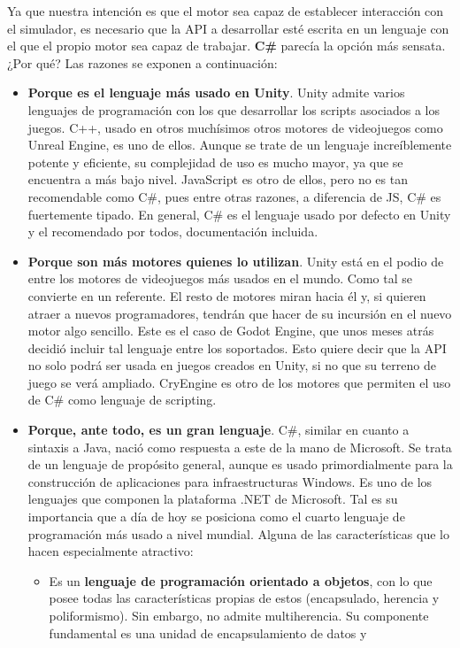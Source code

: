 Ya que nuestra intención es que el motor sea capaz de establecer interacción con el simulador, es necesario que la API a desarrollar esté escrita en un lenguaje con el que el propio motor sea capaz de trabajar. \textbf{C\#} parecía la opción más sensata. ¿Por qué? Las razones se exponen a continuación:

\begin{itemize}
\item\textbf{Porque es el lenguaje más usado en Unity}. Unity admite varios lenguajes de programación con los que desarrollar los scripts asociados a los juegos. C++, usado en otros muchísimos otros motores de videojuegos como Unreal Engine, es uno de ellos. Aunque se trate de un lenguaje increíblemente potente y eficiente, su complejidad de uso es mucho mayor, ya que se encuentra a más bajo nivel. JavaScript es otro de ellos, pero no es tan recomendable como C\#, pues entre otras razones, a diferencia de JS, C\# es fuertemente tipado\cite{unityinaction}. En general, C\# es el lenguaje usado por defecto en Unity y el recomendado por todos, documentación incluida.
\item\textbf{Porque son más motores quienes lo utilizan}. Unity está en el podio de entre los motores de videojuegos más usados en el mundo. Como tal se convierte en un referente. El resto de motores miran hacia él y, si quieren atraer a nuevos programadores, tendrán que hacer de su incursión en el nuevo motor algo sencillo. Este es el caso de Godot Engine, que unos meses atrás decidió incluir tal lenguaje entre los soportados\cite{godotcs}. Esto quiere decir que la API no solo podrá ser usada en juegos creados en Unity, si no que su terreno de juego se verá ampliado. CryEngine es otro de los motores que permiten el uso de C\# como lenguaje de scripting.
\item\textbf{Porque, ante todo, es un gran lenguaje}. C\#, similar en cuanto a sintaxis a Java, nació como respuesta a este de la mano de Microsoft. Se trata de un lenguaje de propósito general, aunque es usado primordialmente para la construcción de aplicaciones para infraestructuras Windows. Es uno de los lenguajes que componen la plataforma .NET de Microsoft. Tal es su importancia que a día de hoy se posiciona como el cuarto lenguaje de programación más usado a nivel mundial\cite{csisfamous}. Alguna de las características que lo hacen especialmente atractivo:
\begin{itemize}
\item Es un \textbf{lenguaje de programación orientado a objetos}, con lo que posee todas las características propias de estos (encapsulado, herencia y poliformismo). Sin embargo, no admite multiherencia. Su componente fundamental es una unidad de encapsulamiento de datos y

\end{itemize}
\end{itemize}
